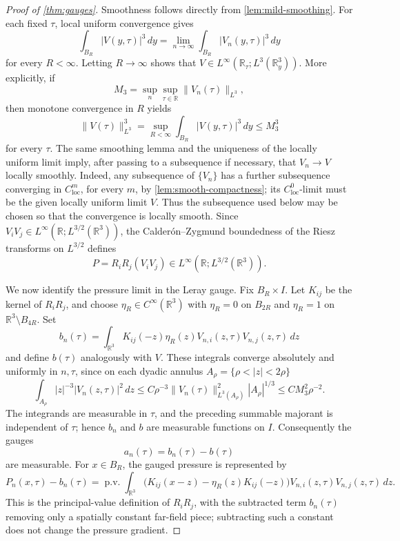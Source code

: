\documentclass[11pt]{amsart}
\theoremstyle{plain}
\theoremstyle{definition}
\theoremstyle{remark}
\numberwithin{equation}{section}
\begin{document}
\begin{proof}[Proof of \cref{thm:gauges}]
Smoothness follows directly from \cref{lem:mild-smoothing}.  For each fixed
\(\tau\), local uniform convergence gives
\[
   \int_{B_R}|V(y,\tau)|^3\,dy
   =
   \lim_{n\to\infty}\int_{B_R}|V_n(y,\tau)|^3\,dy
\]
for every \(R<\infty\).  Letting \(R\to\infty\) shows that
\(V\in L^\infty(\mathbb R_\tau;L^3(\mathbb R^3_y))\).  More explicitly, if
\[
   M_3=\sup_n\sup_{\tau\in\mathbb R}\|V_n(\tau)\|_{L^3},
\]
then monotone convergence in \(R\) yields
\[
   \|V(\tau)\|_{L^3}^3
   =
   \sup_{R<\infty}\int_{B_R}|V(y,\tau)|^3\,dy
   \le M_3^3
\]
for every \(\tau\).  The same smoothing lemma and the uniqueness of the
locally uniform limit imply, after passing to a subsequence if necessary, that
\(V_n\to V\) locally smoothly.  Indeed, any subsequence of \(\{V_n\}\) has a
further subsequence converging in \(C^m_{\mathrm{loc}}\), for every \(m\), by
\cref{lem:smooth-compactness}; its \(C^0_{\mathrm{loc}}\)-limit must be the
given locally uniform limit \(V\).  Thus the subsequence used below may be
chosen so that the convergence is locally smooth.
Since \(V_iV_j\in L^\infty(\mathbb R;L^{3/2}(\mathbb R^3))\), the
Calder\'on--Zygmund boundedness of the Riesz transforms on \(L^{3/2}\)
\cite{Stein1970} defines
\[
   P=R_iR_j(V_iV_j)
   \in L^\infty(\mathbb R;L^{3/2}(\mathbb R^3)).
\]

We now identify the pressure limit in the Leray gauge.  Fix
\(B_R\times I\).  Let \(K_{ij}\) be the kernel of \(R_iR_j\), and choose
\(\eta_R\in C^\infty(\mathbb R^3)\) with \(\eta_R=0\) on \(B_{2R}\) and
\(\eta_R=1\) on \(\mathbb R^3\setminus B_{4R}\).  Set
\[
   b_n(\tau)=\int_{\mathbb R^3}K_{ij}(-z)\eta_R(z)
             V_{n,i}(z,\tau)V_{n,j}(z,\tau)\,dz
\]
and define \(b(\tau)\) analogously with \(V\).  These integrals converge
absolutely and uniformly in \(n,\tau\), since on each dyadic annulus
\(A_\rho=\{\rho<|z|<2\rho\}\)
\[
   \int_{A_\rho}|z|^{-3}|V_n(z,\tau)|^2\,dz
   \le
   C\rho^{-3}\|V_n(\tau)\|_{L^3(A_\rho)}^2 |A_\rho|^{1/3}
   \le C M_3^2\rho^{-2}.
\]
The integrands are measurable in \(\tau\), and the preceding summable
majorant is independent of \(\tau\); hence \(b_n\) and \(b\) are measurable
functions on \(I\).  Consequently the gauges
\[
   a_n(\tau)=b_n(\tau)-b(\tau)
\]
are measurable.
For \(x\in B_R\), the gauged pressure is represented by
\[
   P_n(x,\tau)-b_n(\tau)
   =
   \operatorname{p.v.}\!\int_{\mathbb R^3}
   \bigl(K_{ij}(x-z)-\eta_R(z)K_{ij}(-z)\bigr)
   V_{n,i}(z,\tau)V_{n,j}(z,\tau)\,dz .
\]
This is the principal-value definition of \(R_iR_j\), with the subtracted
term \(b_n(\tau)\) removing only a spatially constant far-field piece;
subtracting such a constant does not change the pressure gradient.


\end{proof}
\end{document}
